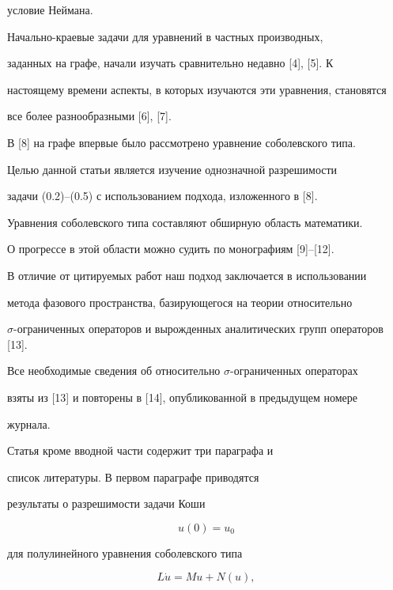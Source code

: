 условие Неймана.





Начально-краевые задачи для уравнений в частных производных, 


заданных на графе, начали изучать сравнительно недавно [4], [5]. К 


настоящему времени аспекты, в которых изучаются эти уравнения, становятся 


все более разнообразными [6], [7].


В [8] на графе впервые было рассмотрено уравнение соболевского типа. 


Целью данной статьи является изучение однозначной разрешимости


задачи (0.2)--(0.5) с использованием подхода, изложенного в [8].


Уравнения соболевского типа составляют обширную область математики. 


О прогрессе в этой области можно судить по монографиям [9]--[12]. 


В отличие от цитируемых работ наш подход заключается в использовании 


метода фазового пространства, базирующегося на теории относительно


$\sigma$-ограниченных операторов и вырожденных аналитических групп операторов [13].


Все необходимые сведения об относительно $\sigma$-ограниченных операторах


взяты из [13] и повторены в [14], опубликованной в предыдущем номере


журнала.





Статья кроме вводной части содержит три параграфа и


список литературы. В первом параграфе приводятся


результаты о разрешимости задачи Коши


\begin{equation}


u(0)=u_0 


\end{equation}


для полулинейного уравнения соболевского типа


\begin{equation}


L\Dot{u}=Mu+N(u),


\end{equation}


